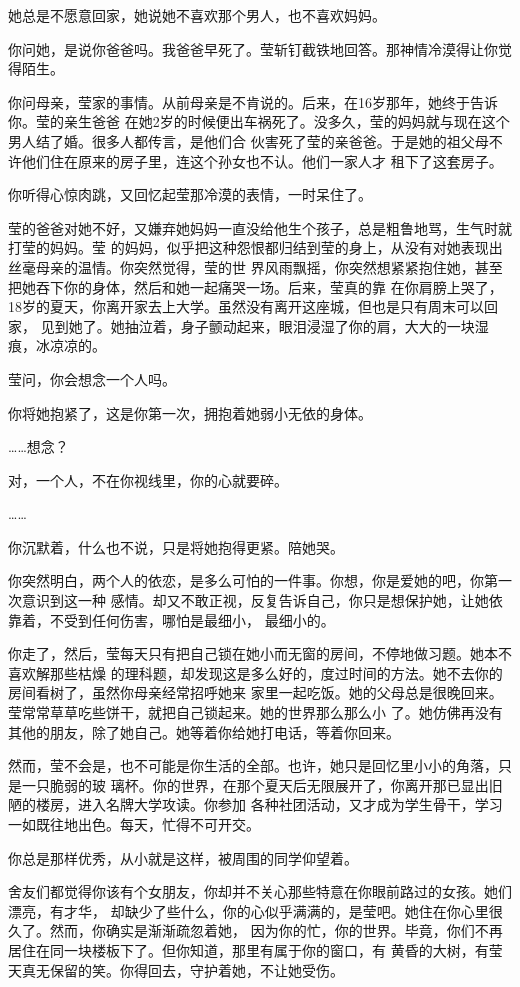 		她总是不愿意回家，她说她不喜欢那个男人，也不喜欢妈妈。

		你问她，是说你爸爸吗。我爸爸早死了。莹斩钉截铁地回答。那神情冷漠得让你觉得陌生。


		你问母亲，莹家的事情。从前母亲是不肯说的。后来，在16岁那年，她终于告诉你。莹的亲生爸爸
	在她2岁的时候便出车祸死了。没多久，莹的妈妈就与现在这个男人结了婚。很多人都传言，是他们合
	伙害死了莹的亲爸爸。于是她的祖父母不许他们住在原来的房子里，连这个孙女也不认。他们一家人才
	租下了这套房子。

		你听得心惊肉跳，又回忆起莹那冷漠的表情，一时呆住了。

		莹的爸爸对她不好，又嫌弃她妈妈一直没给他生个孩子，总是粗鲁地骂，生气时就打莹的妈妈。莹
	的妈妈，似乎把这种怨恨都归结到莹的身上，从没有对她表现出丝毫母亲的温情。你突然觉得，莹的世
	界风雨飘摇，你突然想紧紧抱住她，甚至把她吞下你的身体，然后和她一起痛哭一场。后来，莹真的靠
	在你肩膀上哭了，18岁的夏天，你离开家去上大学。虽然没有离开这座城，但也是只有周末可以回家，
	见到她了。她抽泣着，身子颤动起来，眼泪浸湿了你的肩，大大的一块湿痕，冰凉凉的。

		莹问，你会想念一个人吗。

		你将她抱紧了，这是你第一次，拥抱着她弱小无依的身体。

		……想念？

		对，一个人，不在你视线里，你的心就要碎。

		……

		你沉默着，什么也不说，只是将她抱得更紧。陪她哭。

		你突然明白，两个人的依恋，是多么可怕的一件事。你想，你是爱她的吧，你第一次意识到这一种
	感情。却又不敢正视，反复告诉自己，你只是想保护她，让她依靠着，不受到任何伤害，哪怕是最细小，
	最细小的。

		你走了，然后，莹每天只有把自己锁在她小而无窗的房间，不停地做习题。她本不喜欢解那些枯燥
	的理科题，却发现这是多么好的，度过时间的方法。她不去你的房间看树了，虽然你母亲经常招呼她来
	家里一起吃饭。她的父母总是很晚回来。莹常常草草吃些饼干，就把自己锁起来。她的世界那么那么小
	了。她仿佛再没有其他的朋友，除了她自己。她等着你给她打电话，等着你回来。


		然而，莹不会是，也不可能是你生活的全部。也许，她只是回忆里小小的角落，只是一只脆弱的玻
	璃杯。你的世界，在那个夏天后无限展开了，你离开那已显出旧陋的楼房，进入名牌大学攻读。你参加
	各种社团活动，又才成为学生骨干，学习一如既往地出色。每天，忙得不可开交。

		你总是那样优秀，从小就是这样，被周围的同学仰望着。

		舍友们都觉得你该有个女朋友，你却并不关心那些特意在你眼前路过的女孩。她们漂亮，有才华，
	却缺少了些什么，你的心似乎满满的，是莹吧。她住在你心里很久了。然而，你确实是渐渐疏忽着她，
	因为你的忙，你的世界。毕竟，你们不再居住在同一块楼板下了。但你知道，那里有属于你的窗口，有
	黄昏的大树，有莹天真无保留的笑。你得回去，守护着她，不让她受伤。


